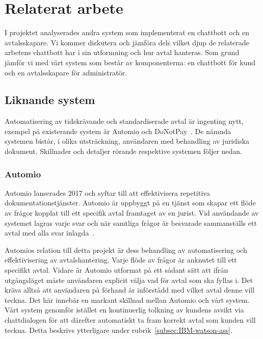\documentclass[a4paper,12pt]{article}
\begin{document}
\section{Relaterat arbete}
\label{sec:related-work}
I projektet analyserades andra system som implementerat en chattbott och en avtalsskapare. Vi kommer diskutera och jämföra dels vilket djup de relaterade arbetens chattbott har i sin utformning och hur avtal hanteras. Som grund jämför vi med vårt system som består av komponenterna: en chattbott för kund och en avtalsskapare för administratör. 

 
\subsection{Liknande system}
\label{subsec:similair-sys}
Automatisering av tidskrävande och standardiserade avtal är ingenting nytt, exempel på existerande system är Automio och DoNotPay~\cite{web:automio, web:donotpay}. De nämnda systemen bistår, i olika utsträckning, användaren med behandling av juridiska dokument. Skillnader och detaljer rörande respektive systemen följer nedan.
\subsubsection{Automio}
Automio lanserades 2017 och syftar till att effektivisera repetitiva dokumentationstjänster. Automio är uppbyggt på en tjänst som skapar ett flöde av frågor kopplat till ett specifik avtal framtaget av en jurist. Vid användande av systemet lagras varje svar och när samtliga frågor är besvarade sammanställs ett avtal med alla svar inlagda~\cite{web:law-society-Automio}.

Automios relation till detta projekt är dess behandling av automatisering och effektivisering av avtalshantering. Varje flöde av frågor är anknutet till ett specifikt avtal. Vidare är Automio utformat på ett sådant sätt att ifrån utgångsläget måste användaren explicit välja vad för avtal som ska fyllas i. Det krävs alltså att användaren på förhand är införstådd med vilket avtal denne vill teckna. Det här innebär en markant skillnad mellan Automio och vårt system. Vårt system genomför istället en kontinuerlig tolkning av kundens avsikt via chattdialogen för att därefter automatiskt ta fram korrekt avtal som kunden vill teckna. Detta beskrivs ytterligare under rubrik~\ref{subsec:IBM-watson-ass}.
\end{document}
